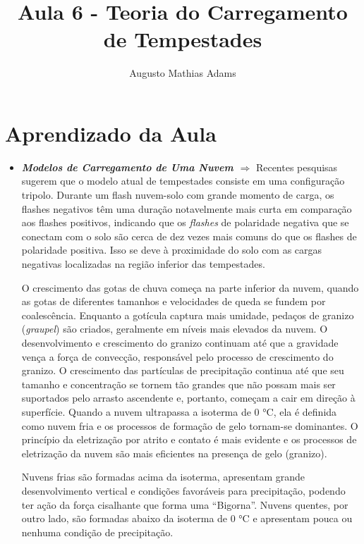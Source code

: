 \documentclass[a4paper, 12pt, onecolumn,singlespacing]{article}
\title{Aula 6 - Teoria do Carregamento de Tempestades}
\author[1]{Augusto Mathias Adams}
\affil[1]{augusto.adams@ufpr.br}
\begin{document}
	
	\maketitle
	
	\section{Aprendizado da Aula}
	
	\begin{itemize}
		
		\item \textbf{\textit{Modelos de Carregamento de Uma Nuvem $\Rightarrow$ }}Recentes pesquisas sugerem que o modelo atual de tempestades consiste em uma configuração tripolo. Durante um flash nuvem-solo com grande momento de carga, os flashes negativos têm uma duração notavelmente mais curta em comparação aos flashes positivos, indicando que os \textit{flashes} de polaridade negativa que se conectam com o solo são cerca de dez vezes mais comuns do que os flashes de polaridade positiva. Isso se deve à proximidade do solo com as cargas negativas localizadas na região inferior das tempestades.
		
		O crescimento das gotas de chuva começa na parte inferior da nuvem, quando as gotas de diferentes tamanhos e velocidades de queda se fundem por coalescência. Enquanto a gotícula captura mais umidade, pedaços de granizo (\textit{graupel}) são criados, geralmente em níveis mais elevados da nuvem. O desenvolvimento e crescimento do granizo continuam até que a gravidade vença a força de convecção, responsável pelo processo de crescimento do granizo. O crescimento das partículas de precipitação continua até que seu tamanho e concentração se tornem tão grandes que não possam mais ser suportados pelo arrasto ascendente e, portanto, começam a cair em direção à superfície. Quando a nuvem ultrapassa a isoterma de 0 °C, ela é definida como nuvem fria e os processos de formação de gelo tornam-se dominantes. O princípio da eletrização por atrito e contato é mais evidente e os processos de eletrização da nuvem são mais eficientes na presença de gelo (granizo).
		
		Nuvens frias são formadas acima da isoterma, apresentam grande desenvolvimento vertical e condições favoráveis para precipitação, podendo ter ação da força cisalhante que forma uma ``Bigorna''. Nuvens quentes, por outro lado, são formadas abaixo da isoterma de 0 °C e apresentam pouca ou nenhuma condição de precipitação.
		

\end{itemize}
\end{document}
